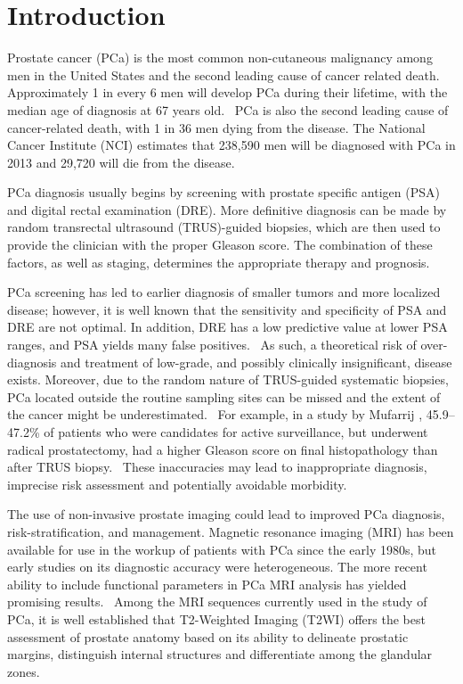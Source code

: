 \section{Introduction}\label{sect:intro}
Prostate cancer (PCa) is the most common non-cutaneous malignancy among men in
the United States and the second leading cause of cancer related
death.~\cite{Howlader2011} Approximately 1 in every 6 men will develop PCa
during their lifetime, with the median age of diagnosis at 67 years
old.~\cite{Howlader2011} PCa is also the second leading cause of cancer-related
death, with 1 in 36 men dying from the disease.  The National Cancer Institute
(NCI) estimates that 238,590 men will be diagnosed with PCa in 2013 and 29,720
will die from the disease.~\cite{Howlader2011}

PCa diagnosis usually begins by screening with prostate specific antigen (PSA)
and digital rectal examination (DRE).  More definitive diagnosis can be made by
random transrectal ultrasound (TRUS)-guided biopsies, which are then used to
provide the clinician with the proper Gleason score. The combination of these
factors, as well as staging, determines the appropriate therapy and prognosis.

PCa screening has led to earlier diagnosis of smaller tumors and more localized
disease; however, it is well known that the sensitivity and specificity of PSA
and DRE are not optimal. In addition, DRE has a low predictive value at lower
PSA ranges, and PSA yields many false
positives.~\cite{Gosselaar2007,Gupta2013,Hricak2007} As such, a theoretical
risk of over-diagnosis and treatment of low-grade, and possibly clinically
insignificant, disease exists.  Moreover, due to the random nature of
TRUS-guided systematic biopsies, PCa located outside the routine sampling sites
can be missed and the extent of the cancer might be
underestimated.~\cite{Gupta2013,Cornud2012} For example, in a study by Mufarrij
\etal, 45.9--47.2\% of patients who were candidates for active surveillance,
but underwent radical prostatectomy, had a higher Gleason score on final
histopathology than after TRUS biopsy.~\cite{Mufarrij2010} These inaccuracies
may lead to inappropriate diagnosis, imprecise risk assessment and potentially
avoidable morbidity.

The use of non-invasive prostate imaging could lead to improved PCa diagnosis,
risk-stratification, and management.  Magnetic resonance imaging (MRI) has been
available for use in the workup of patients with PCa since the early 1980s, but
early studies on its diagnostic accuracy were heterogeneous.  The more
recent ability to include functional parameters in PCa MRI analysis has yielded
promising results.~\cite{Gupta2013,Hricak2007} Among the MRI sequences
currently used in the study of PCa, it is well established that T2-Weighted
Imaging (T2WI) offers the best assessment of prostate anatomy based on its
ability to delineate prostatic margins, distinguish internal structures and
differentiate among the glandular zones. 

